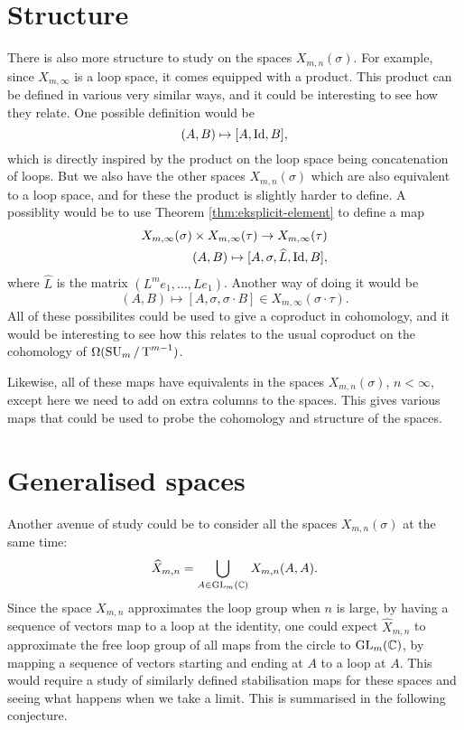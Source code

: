 \section{Structure}

There is also more structure to study on the spaces
$X_{m,n}(\sigma)$. For example, since $X_{m,\infty}$ is a
loop space, it comes equipped with a product. This product can be
defined in various very similar ways, and it could be interesting to
see how they relate. One possible definition would be
\[ (A,B) \mapsto [A,\operatorname{Id}, B], \]
which is directly inspired by the product on the loop space being
concatenation of loops. But we also have the other spaces
$X_{m,n}(\sigma)$ which are also equivalent to a loop space, and for
these the product is slightly harder to define. A possiblity would be
to use Theorem \ref{thm:eksplicit-element} to define a map
\begin{align*}
  X_{m,\infty}(\sigma) \times X_{m,\infty}(\tau) \to
  X_{m,\infty}(\tau) \\
  (A,B) \mapsto [A,\sigma,\widehat{L},\operatorname{Id},B],
\end{align*}
where $\widehat{L}$ is the matrix $(L^m e_1,\dots,Le_1)$. Another way
of doing it would be
\[ (A,B) \mapsto [A,\sigma,\sigma\cdot B] \in
X_{m,\infty}(\sigma\cdot\tau). \]
All of these possibilites could be used to give a coproduct in
cohomology, and it would be interesting to see how this relates to the
usual coproduct on the cohomology of $\Omega(\operatorname{SU}_{m}/\operatorname{T}^{m-1})$.

Likewise, all of these maps have equivalents in the spaces
$X_{m,n}(\sigma)$, $n < \infty$, except here we
need to add on extra columns to the spaces. This gives various maps
that could be used to probe the cohomology and structure of the
spaces.

\section{Generalised spaces}

Another avenue of study could be to consider all the spaces
$X_{m,n}(\sigma)$ at the same time:
\[ \widehat{X}_{m,n} = \bigcup_{A \in \operatorname{GL}_m(\mathbb{C})} X_{m,n}(A,A). \]
Since the space $X_{m,n}$ approximates the loop group when $n$ is
large, by having a sequence of vectors map to a loop at the identity,
one could expect $\widehat{X}_{m,n}$ to approximate the free loop
group of all maps from the circle to $\operatorname{GL}_m(\mathbb{C})$, by mapping a
sequence of vectors starting and ending at $A$ to a loop at $A$. This
would require a study of similarly defined stabilisation maps for
these spaces and seeing what happens when we take a limit. This
is summarised in the following conjecture.

